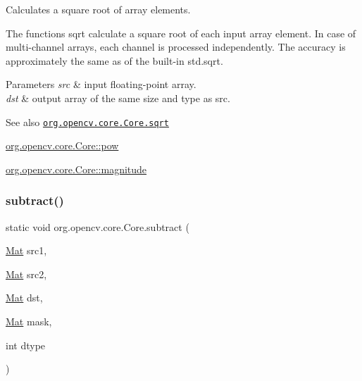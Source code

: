 Calculates a square root of array elements.

The functions {\ttfamily sqrt} calculate a square root of each input array element. In case of multi-\/channel arrays, each channel is processed independently. The accuracy is approximately the same as of the built-\/in {\ttfamily std.\+sqrt}.


\begin{DoxyParams}{Parameters}
{\em src} & input floating-\/point array. \\
\hline
{\em dst} & output array of the same size and type as {\ttfamily src}.\\
\hline
\end{DoxyParams}
\begin{DoxySeeAlso}{See also}
\href{http://docs.opencv.org/modules/core/doc/operations_on_arrays.html#sqrt}{\tt org.\+opencv.\+core.\+Core.\+sqrt} 

\mbox{\hyperlink{classorg_1_1opencv_1_1core_1_1_core_a29c20af97ae09c75246777774bc6d41b}{org.\+opencv.\+core.\+Core\+::pow}} 

\mbox{\hyperlink{classorg_1_1opencv_1_1core_1_1_core_ac0195922fb03d6bad195054e615cb4e1}{org.\+opencv.\+core.\+Core\+::magnitude}} 
\end{DoxySeeAlso}
\mbox{\label{classorg_1_1opencv_1_1core_1_1_core_a8020349ec5e9b654d78d690654c79606}} 
\subsubsection{\texorpdfstring{subtract()}{subtract()}\hspace{0.1cm}{\footnotesize\ttfamily [1/6]}}
{\footnotesize\ttfamily static void org.\+opencv.\+core.\+Core.\+subtract (\begin{DoxyParamCaption}\item[{\mbox{\hyperlink{classorg_1_1opencv_1_1core_1_1_mat}{Mat}}}]{src1,  }\item[{\mbox{\hyperlink{classorg_1_1opencv_1_1core_1_1_mat}{Mat}}}]{src2,  }\item[{\mbox{\hyperlink{classorg_1_1opencv_1_1core_1_1_mat}{Mat}}}]{dst,  }\item[{\mbox{\hyperlink{classorg_1_1opencv_1_1core_1_1_mat}{Mat}}}]{mask,  }\item[{int}]{dtype }\end{DoxyParamCaption})\hspace{0.3cm}{\ttfamily [static]}}

